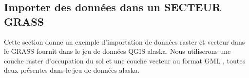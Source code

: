 \subsection{Importer des données dans un SECTEUR GRASS}\label{sec:import_loc_data}
Cette section donne un exemple d'importation de données raster et vecteur dans le  GRASS  fournit dans le jeu de données QGIS alaska. Nous utiliserons une couche raster d'occupation du sol  et une couche vecteur au format GML , toutes deux présentes dans le jeu de données alaska.
